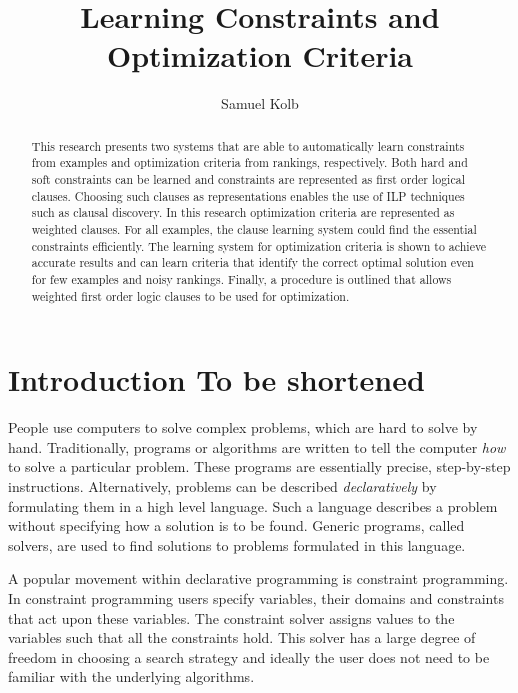 \documentclass{llncs}
\begin{document}
\title{Learning Constraints and Optimization Criteria}
\author{Samuel Kolb}

\maketitle              %

\begin{abstract}
This research presents two systems that are able to automatically learn constraints from examples and optimization criteria from rankings, respectively.
Both hard and soft constraints can be learned and constraints are represented as first order logical clauses.
Choosing such clauses as representations enables the use of ILP techniques such as clausal discovery.
In this research optimization criteria are represented as weighted clauses.
For all examples, the clause learning system could find the essential constraints efficiently.
The learning system for optimization criteria is shown to achieve accurate results and can learn criteria that identify the correct optimal solution even for few examples and noisy rankings.
Finally, a procedure is outlined that allows weighted first order logic clauses to be used for optimization.
\end{abstract}

\section{Introduction {\color{red} To be shortened}}
People use computers to solve complex problems, which are hard to solve by hand.
Traditionally, programs or algorithms are written to tell the computer \emph{how} to solve a particular problem.
These programs are essentially precise, step-by-step instructions.
Alternatively, problems can be described \emph{declaratively} by formulating them in a high level language.
Such a language describes a problem without specifying how a solution is to be found.
Generic programs, called solvers, are used to find solutions to problems formulated in this language.

A popular movement within declarative programming is constraint programming.
In constraint programming users specify variables, their domains and constraints that act upon these variables.
The constraint solver assigns values to the variables such that all the constraints hold.
This solver has a large degree of freedom in choosing a search strategy and ideally the user does not need to be familiar with the underlying algorithms.
\end{document}

